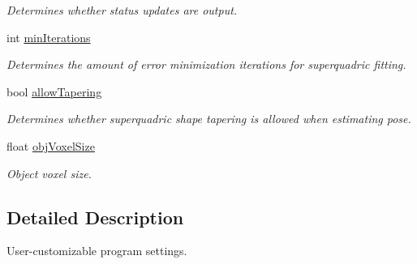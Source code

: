 \begin{DoxyCompactItemize}
\begin{DoxyCompactList}\small\item\em Determines whether status updates are output. \end{DoxyCompactList}\item 
\hypertarget{classope_1_1_o_p_e_settings_a8d98f9126b68cae7be1835a22fac2bbf}{int \hyperlink{classope_1_1_o_p_e_settings_a8d98f9126b68cae7be1835a22fac2bbf}{min\-Iterations}}\label{classope_1_1_o_p_e_settings_a8d98f9126b68cae7be1835a22fac2bbf}

\begin{DoxyCompactList}\small\item\em Determines the amount of error minimization iterations for superquadric fitting. \end{DoxyCompactList}\item 
\hypertarget{classope_1_1_o_p_e_settings_a6aa541f813a976e22d0167dcbae2bc2d}{bool \hyperlink{classope_1_1_o_p_e_settings_a6aa541f813a976e22d0167dcbae2bc2d}{allow\-Tapering}}\label{classope_1_1_o_p_e_settings_a6aa541f813a976e22d0167dcbae2bc2d}

\begin{DoxyCompactList}\small\item\em Determines whether superquadric shape tapering is allowed when estimating pose. \end{DoxyCompactList}\item 
\hypertarget{classope_1_1_o_p_e_settings_aac1d4b558c0beac3a938c63891cd74c4}{float \hyperlink{classope_1_1_o_p_e_settings_aac1d4b558c0beac3a938c63891cd74c4}{obj\-Voxel\-Size}}\label{classope_1_1_o_p_e_settings_aac1d4b558c0beac3a938c63891cd74c4}

\begin{DoxyCompactList}\small\item\em Object voxel size. \end{DoxyCompactList}\end{DoxyCompactItemize}


\subsection{Detailed Description}
User-\/customizable program settings. 

